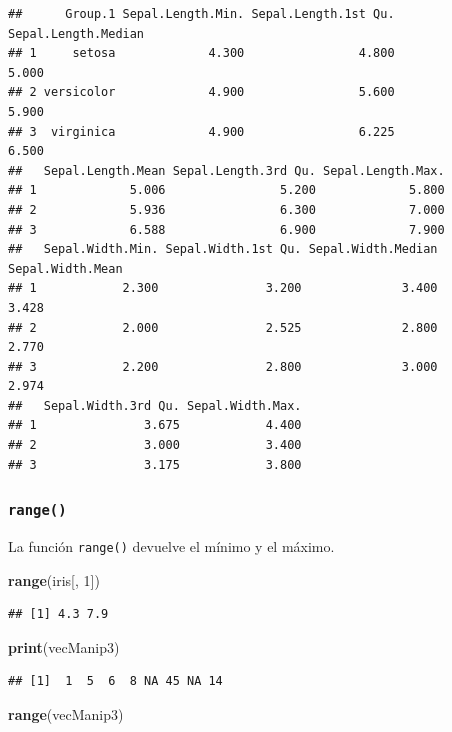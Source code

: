\documentclass[]{book}
\newenvironment{Shaded}{\begin{snugshade}}{\end{snugshade}}
\newcommand{\KeywordTok}[1]{\textcolor[rgb]{0.13,0.29,0.53}{\textbf{#1}}}
\newcommand{\DecValTok}[1]{\textcolor[rgb]{0.00,0.00,0.81}{#1}}
\newcommand{\NormalTok}[1]{#1}
\begin{document}
\begin{verbatim}
##      Group.1 Sepal.Length.Min. Sepal.Length.1st Qu. Sepal.Length.Median
## 1     setosa             4.300                4.800               5.000
## 2 versicolor             4.900                5.600               5.900
## 3  virginica             4.900                6.225               6.500
##   Sepal.Length.Mean Sepal.Length.3rd Qu. Sepal.Length.Max.
## 1             5.006                5.200             5.800
## 2             5.936                6.300             7.000
## 3             6.588                6.900             7.900
##   Sepal.Width.Min. Sepal.Width.1st Qu. Sepal.Width.Median Sepal.Width.Mean
## 1            2.300               3.200              3.400            3.428
## 2            2.000               2.525              2.800            2.770
## 3            2.200               2.800              3.000            2.974
##   Sepal.Width.3rd Qu. Sepal.Width.Max.
## 1               3.675            4.400
## 2               3.000            3.400
## 3               3.175            3.800
\end{verbatim}

\subsubsection{\texorpdfstring{\texttt{range()}}{range()}}\label{l015range}

La función \texttt{range()} devuelve el mínimo y el máximo.

\begin{Shaded}
\begin{Highlighting}[]
\KeywordTok{range}\NormalTok{(iris[, }\DecValTok{1}\NormalTok{])}
\end{Highlighting}
\end{Shaded}

\begin{verbatim}
## [1] 4.3 7.9
\end{verbatim}

\begin{Shaded}
\begin{Highlighting}[]
\KeywordTok{print}\NormalTok{(vecManip3)}
\end{Highlighting}
\end{Shaded}

\begin{verbatim}
## [1]  1  5  6  8 NA 45 NA 14
\end{verbatim}

\begin{Shaded}
\begin{Highlighting}[]
\KeywordTok{range}\NormalTok{(vecManip3)}
\end{Highlighting}
\end{Shaded}
\end{document}
